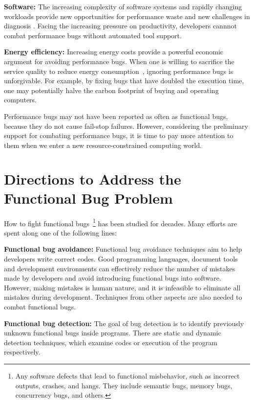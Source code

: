 {\bf Software:} The increasing complexity of software systems and rapidly 
changing workloads provide new opportunities for performance waste and
new challenges in diagnosis
\citep{BloatFSE2008}.
Facing the increasing pressure on productivity, 
developers cannnot combat performance bugs without automated tool support. 

{\bf Energy efficiency:} 
Increasing energy costs provide a powerful economic 
argument for avoiding performance bugs. 
When one is willing to sacrifice the service quality to reduce 
energy consumption~\citep{green.pldi10,asplos11karthik}, 
ignoring performance bugs is unforgivable.
For example, by fixing bugs that have doubled the
execution time,
one may potentially
halve the carbon footprint of buying and operating computers.

Performance bugs may not have been reported as often as functional bugs, because 
they do not cause fail-stop failures.
However, considering the preliminary support for
combating performance bugs,
it is time to pay more attention to them
when we enter a new resource-constrained computing world.

\section{Directions to Address the Functional Bug Problem}
How to fight functional bugs~\footnote{Any software defects that lead to functional misbehavior,
such as incorrect outputs, crashes, and hangs. They include
semantic bugs, memory bugs, concurrency bugs, and others.} has been studied for decades.
Many efforts are spent along one of the following lines:

{\bf Functional bug avoidance:}
Functional bug avoidance techniques aim to help developers write correct codes. Good programming languages,
document tools and development environments can effectively reduce the number of mistakes made by developers
and avoid introducing functional bugs into software.
However, making mistakes is human nature,
and it is infeasible to eliminate all mistakes during development.
Techniques from other aspects are also needed to combat functional bugs.

{\bf Functional bug detection:}
The goal of bug detection is to identify previously
unknown functional bugs inside programs.
There are static and dynamic detection techniques,
which examine codes or execution of the program respectively.

